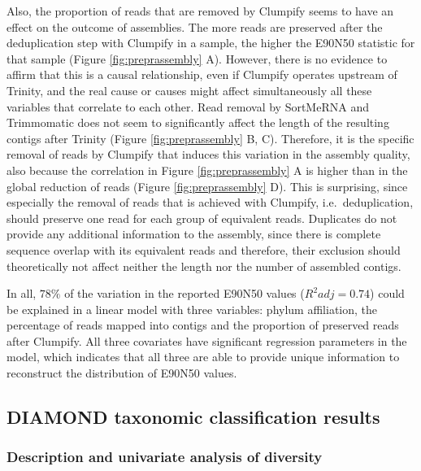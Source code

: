 \documentclass[
  openany]{book}
\begin{document}
Also, the proportion of reads that are removed by Clumpify seems to have an effect on the outcome of assemblies. The more reads are preserved after the deduplication step with Clumpify in a sample, the higher the E90N50 statistic for that sample (Figure \ref{fig:preprassembly} A). However, there is no evidence to affirm that this is a causal relationship, even if Clumpify operates upstream of Trinity, and the real cause or causes might affect simultaneously all these variables that correlate to each other. Read removal by SortMeRNA and Trimmomatic does not seem to significantly affect the length of the resulting contigs after Trinity (Figure \ref{fig:preprassembly} B, C). Therefore, it is the specific removal of reads by Clumpify that induces this variation in the assembly quality, also because the correlation in Figure \ref{fig:preprassembly} A is higher than in the global reduction of reads (Figure \ref{fig:preprassembly} D). This is surprising, since especially the removal of reads that is achieved with Clumpify, i.e.~deduplication, should preserve one read for each group of equivalent reads. Duplicates do not provide any additional information to the assembly, since there is complete sequence overlap with its equivalent reads and therefore, their exclusion should theoretically not affect neither the length nor the number of assembled contigs.

In all, \(78\%\) of the variation in the reported E90N50 values (\(R^2adj = 0.74\)) could be explained in a linear model with three variables: phylum affiliation, the percentage of reads mapped into contigs and the proportion of preserved reads after Clumpify. All three covariates have significant regression parameters in the model, which indicates that all three are able to provide unique information to reconstruct the distribution of E90N50 values.

\hypertarget{diamond-taxonomic-classification-results}{%
\subsection{DIAMOND taxonomic classification results}\label{diamond-taxonomic-classification-results}}

\hypertarget{description-and-univariate-analysis-of-diversity-1}{%
\subsubsection{Description and univariate analysis of diversity}\label{description-and-univariate-analysis-of-diversity-1}}
\end{document}
